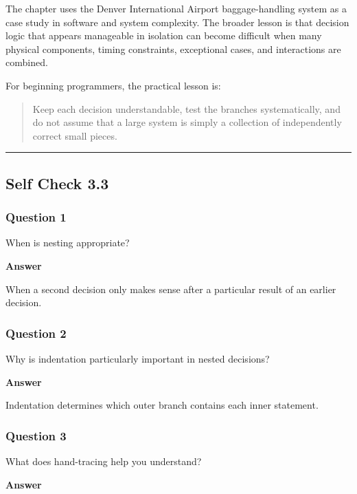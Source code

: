 \documentclass[
  11pt,
  a4paper,
]{article}
\begin{document}
The chapter uses the Denver International Airport baggage-handling
system as a case study in software and system complexity. The broader
lesson is that decision logic that appears manageable in isolation can
become difficult when many physical components, timing constraints,
exceptional cases, and interactions are combined.

For beginning programmers, the practical lesson is:

\begin{quote}
Keep each decision understandable, test the branches systematically, and
do not assume that a large system is simply a collection of
independently correct small pieces.
\end{quote}

\begin{center}\rule{0.5\linewidth}{0.5pt}\end{center}

\subsection{Self Check 3.3}\label{self-check-3.3}

\subsubsection{Question 1}\label{question-1-2}

When is nesting appropriate?

\textbf{Answer}

When a second decision only makes sense after a particular result of an
earlier decision.

\subsubsection{Question 2}\label{question-2-2}

Why is indentation particularly important in nested decisions?

\textbf{Answer}

Indentation determines which outer branch contains each inner statement.

\subsubsection{Question 3}\label{question-3-2}

What does hand-tracing help you understand?

\textbf{Answer}
\end{document}
